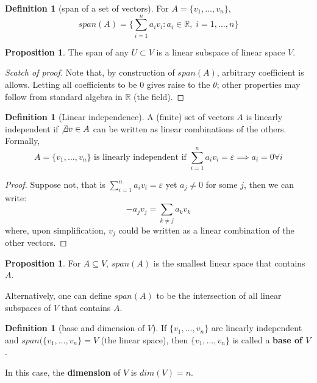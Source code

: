 \documentclass[12pt]{article}
\newcommand{\R}{{\mathbb R}}
\theoremstyle{definition}
\newtheorem{definition}[theorem]{Definition}
\newtheorem{proposition}[theorem]{Proposition}
\theoremstyle{plain}
\begin{document}
\begin{definition}
    [span of a set of vectors] For $A = \{ v_1, \ldots, v_n\}$, 
    \[
        span(A) = \{ \sum_{i=1}^n a_i v_i : a_i \in \R, \; i = 1, \ldots, n\}
    \]
\end{definition}

\begin{proposition}
    The span of any $U\subset V$ is a linear subspace of linear space $V$.
\end{proposition}
\begin{proof}[Scatch of proof]
    Note that, by construction of $span(A)$, arbitrary coefficient is allows. 
    Letting all coefficients to be $0$ gives raise to the $\theta$; other 
    properties may follow from standard algebra in $\R$ (the field). 
\end{proof}

\begin{definition}
    [Linear independence]

    A (finite) set of vectors $A$ is linearly independent if $\not\exists v \in A$ can be 
    written as linear combinations of the others. Formally, 
    \[
        A = \{ v_1, \ldots, v_n \} \text{ is linearly independent if } 
        \sum_{i=1}^n a_i v_i = \varepsilon \implies a_i = 0 \forall i
    \]
    \begin{proof}
        Suppose not, that is $\sum_{i=1}^n a_i v_i = \varepsilon$ yet $a_j \not= 
        0$ for some $j$, then we can write: 
        \[
            -a_j v_j = \sum_{k\not=j} a_k v_k
        \]
        where, upon simplification, $v_j$ could be written as a linear 
        combination of the other vectors.
    \end{proof}
\end{definition}

\begin{proposition}
    For $A \subseteq V$, $span(A)$ is the smallest linear space that contains 
    $A$.

    Alternatively, one can define $span(A)$ to be the intersection of all linear 
    subspaces of $V$ that contains $A$.
\end{proposition}

\begin{definition}
    [base and dimension of $V$]
    If $\{v_1, \ldots, v_n\}$ are linearly independent and $span(\{v_1, \ldots, 
        v_n\} = V$ (the linear space), then $\{v_1,\ldots, v_n\}$ is called a 
        \textbf{base of $V$}.

        In this case, the \textbf{dimension} of $V$ is $dim(V) = n$.
\end{definition}
\end{document}
